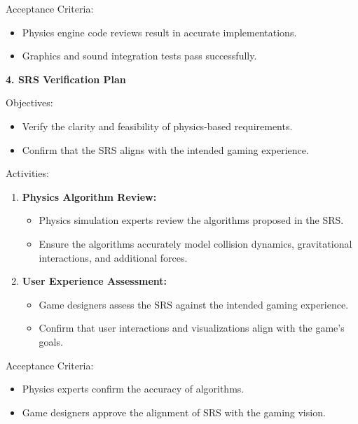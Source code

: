\documentclass[
]{article}
\begin{document}
Acceptance Criteria:

\begin{itemize}
\item
  Physics engine code reviews result in accurate implementations.
\item
  Graphics and sound integration tests pass successfully.
\end{itemize}

\protect\hypertarget{Ac}{}{}\textbf{4. SRS Verification Plan}

Objectives:

\begin{itemize}
\item
  Verify the clarity and feasibility of physics-based requirements.
\item
  Confirm that the SRS aligns with the intended gaming experience.
\end{itemize}

Activities:

\begin{enumerate}
\def\labelenumi{\arabic{enumi}.}
\item
  \textbf{Physics Algorithm Review:}

  \begin{itemize}
  \item
    Physics simulation experts review the algorithms proposed in the
    SRS.
  \item
    Ensure the algorithms accurately model collision dynamics,
    gravitational interactions, and additional forces.
  \end{itemize}
\item
  \textbf{User Experience Assessment:}

  \begin{itemize}
  \item
    Game designers assess the SRS against the intended gaming
    experience.
  \item
    Confirm that user interactions and visualizations align with the
    game's goals.
  \end{itemize}
\end{enumerate}

Acceptance Criteria:

\begin{itemize}
\item
  Physics experts confirm the accuracy of algorithms.
\item
  Game designers approve the alignment of SRS with the gaming vision.
\end{itemize}
\end{document}
